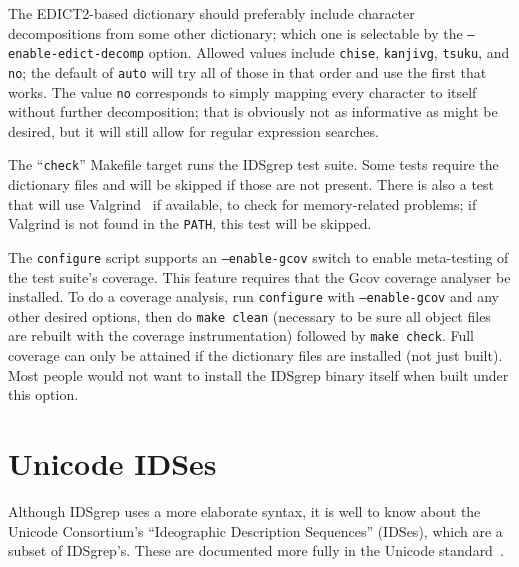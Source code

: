 \documentclass[twocolumn]{report}
\begin{document}
The EDICT2-based dictionary should preferably include
character decompositions from some other dictionary; which one is
selectable by the \texttt{--enable-edict-decomp} option.  Allowed values
include \texttt{chise}, \texttt{kanjivg}, \texttt{tsuku}, and \texttt{no};
the default of \texttt{auto} will try all of those in that order and use the
first that works.  The value \texttt{no} corresponds to simply mapping every
character to itself without further decomposition; that is obviously not as
informative as might be desired, but it will still allow for regular
expression searches.

The ``\texttt{check}'' Makefile target runs the IDSgrep test suite.  Some
tests require the dictionary files and will be skipped if those are not
present.  There is also a test that will use Valgrind~\cite{Valgrind} if
available, to check for memory-related problems; if Valgrind is not found in
the \texttt{PATH}, this test will be skipped.

The \texttt{configure} script supports an \texttt{--enable-gcov} switch to
enable meta-testing of the test suite's coverage.  This feature requires
that the Gcov coverage analyser be installed.  To do a coverage analysis,
run \texttt{configure} with \texttt{--enable-gcov} and any other desired
options, then do \texttt{make clean} (necessary to be sure all object files
are rebuilt with the coverage instrumentation) followed by \texttt{make
check}.  Full coverage can only be attained if the dictionary files are
installed (not just built).  Most people would not want to install the
IDSgrep binary itself when built under this option.


\section{Unicode IDSes}

Although IDSgrep uses a more elaborate syntax, it is well to know
about the Unicode Consortium's ``Ideographic Description Sequences''
(IDSes), which are a subset of IDSgrep's.  These are documented
more fully in the Unicode standard~\cite{Unicode:IDS}.
\end{document}

